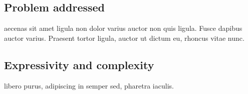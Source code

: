 \subsection{Problem addressed}

aecenas sit amet ligula non dolor varius auctor non quis ligula. Fusce dapibus auctor varius. Praesent tortor ligula, auctor ut dictum eu, rhoncus vitae nunc.

\subsection{Expressivity and complexity}

 libero purus, adipiscing in semper sed, pharetra iaculis.
